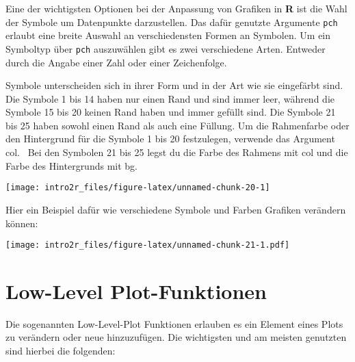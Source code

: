\documentclass[
]{book}
\begin{document}
Eine der wichtigsten Optionen bei der Anpassung von Grafiken in \textbf{R} ist die Wahl der Symbole um Datenpunkte darzustellen.
Das dafür genutzte Argumente \texttt{pch} erlaubt eine breite Auswahl an verschiedensten Formen an Symbolen.
Um ein Symboltyp über \texttt{pch} auszuwählen gibt es zwei verschiedene Arten.
Entweder durch die Angabe einer Zahl oder einer Zeichenfolge.

Symbole unterscheiden sich in ihrer Form und in der Art wie sie eingefärbt sind.
Die Symbole 1 bis 14 haben nur einen Rand und sind immer leer, während die Symbole 15 bis 20 keinen Rand haben und immer gefüllt sind.
Die Symbole 21 bis 25 haben sowohl einen Rand als auch eine Füllung.
Um die Rahmenfarbe oder den Hintergrund für die Symbole 1 bis 20 festzulegen, verwende das Argument col.~
Bei den Symbolen 21 bis 25 legst du die Farbe des Rahmens mit col und die Farbe des Hintergrunds mit bg.

\begin{center}\texttt{[image: intro2r\_files/figure-latex/unnamed-chunk-20-1]} \end{center}

Hier ein Beispiel dafür wie verschiedene Symbole und Farben Grafiken verändern können:

\texttt{[image: intro2r\_files/figure-latex/unnamed-chunk-21-1.pdf]}

\hypertarget{low-level-plot-funktionen}{%
\section{Low-Level Plot-Funktionen}\label{low-level-plot-funktionen}}

Die sogenannten Low-Level-Plot Funktionen erlauben es ein Element eines Plots zu verändern oder neue hinzuzufügen.
Die wichtigsten und am meisten genutzten sind hierbei die folgenden:
\end{document}
